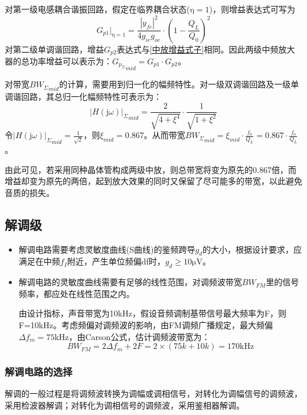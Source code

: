 \documentclass[a4paper,12pt,twoside]{article}
\begin{document}
对第一级电感耦合谐振回路，假定在临界耦合状态($\mathrm{\eta}=1$)，则增益表达式可写为
\begin{equation}
G_{p1}|_{\mathrm{\eta}=1}=\frac{|y_{fe}|^2}{4g_{ie}g_{oe}}\cdot (1-\frac{Q_L}{Q_0})^2
\label{中放增益式子}
\end{equation}
对第二级单调谐回路，增益$G_{p2}$表达式与\ref{中放增益式子}相同。因此两级中频放大器的总功率增益可以表示为：${G_{p_{\Sigma}}}_{mid}=G_{p1}\cdot G_{p2}$。

对带宽${BW_{\Sigma}}_{mid}$的计算，需要用到归一化的幅频特性。对一级双调谐回路及一级单调谐回路，其总归一化幅频特性可表示为：
\begin{equation}
    {|H(\mathrm{j}\omega)|_{\Sigma}}_{mid}=\frac{2}{\sqrt{4+\xi ^{4}}}\cdot \frac{1}{\sqrt{1+\xi ^2}}
    \label{式18}
\end{equation}
令$ {|H(\mathrm{j}\omega)|_{\Sigma}}_{mid}=\frac{1}{\sqrt{2}}$，则$\xi_{mid}=0.867$。从而带宽${BW_{\Sigma}}_{mid}=\xi_{mid}\cdot \frac{f_0}{Q_L}=0.867\cdot \frac{f_0}{Q_L}$。

由此可见，若采用同种晶体管构成两级中放，则总带宽将变为原先的0.867倍，而增益却变为原先的两倍，起到放大效果的同时又保留了尽可能多的带宽，以此避免音质的损失。

\subsection{解调级}
\begin{itemize}
    \item 解调电路需要考虑灵敏度曲线(S曲线)的鉴频跨导$g_{d}$的大小，根据设计要求，应满足在中频$f_{I}$附近，产生单位频偏df时，$g_{d}\ge 10\mathrm{\mu V}$。
    \item 解调电路的灵敏度曲线需要有足够的线性范围，对调频波带宽$BW_{FM}$里的信号频率，都应处在线性范围之内。
    
    由设计指标，声音带宽为10kHz，假设音频调制基带信号最大频率为F，则F=10kHz。考虑频偏对调频波的影响，由FM调频广播规定，最大频偏$\Delta f_{m}=75$kHz，由Carson公式，估计调频波带宽为：
    \begin{equation}
        BW_{FM}=2\Delta f_{m}+2F=2\times (75k+10k)=170\mathrm{kHz}
        \label{FM带宽}
    \end{equation}
\end{itemize}




\subsubsection{解调电路的选择}
解调的一般过程是将调频波转换为调幅或调相信号，对转化为调幅信号的调频波，采用检波器解调；对转化为调相信号的调频波，采用鉴相器解调。
\end{document}
